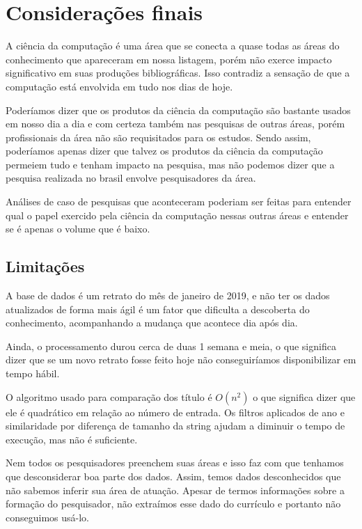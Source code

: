 \chapter{Considerações finais}

A ciência da computação é uma área que se conecta a quase todas as áreas do conhecimento que apareceram em nossa listagem, porém não exerce impacto significativo em suas produções bibliográficas. Isso contradiz a sensação de que a computação está envolvida em tudo nos dias de hoje.

Poderíamos dizer que os produtos da ciência da computação são bastante usados em nosso dia a dia e com certeza também nas pesquisas de outras áreas, porém profissionais da área não são requisitados para os estudos. Sendo assim, poderíamos apenas dizer que talvez os produtos da ciência da computação permeiem tudo e tenham impacto na pesquisa, mas não podemos dizer que a pesquisa realizada no brasil envolve pesquisadores da área.

Análises de caso de pesquisas que aconteceram poderiam ser feitas para entender qual o papel exercido pela ciência da computação nessas outras áreas e entender se é apenas o volume que é baixo.

\section{Limitações}

A base de dados é um retrato do mês de janeiro de 2019, e não ter os dados atualizados de forma mais ágil é um fator que dificulta a descoberta do conhecimento, acompanhando a mudança que acontece dia após dia.

Ainda, o processamento durou cerca de duas 1 semana e meia, o que significa dizer que se um novo retrato fosse feito hoje não conseguiríamos disponibilizar em tempo hábil.

O algoritmo usado para comparação dos título é $O(n^2)$ o que significa dizer que ele é quadrático em relação ao número de entrada. Os filtros aplicados de ano e similaridade por diferença de tamanho da string ajudam a diminuir o tempo de execução, mas não é suficiente.

Nem todos os pesquisadores preenchem suas áreas e isso faz com que tenhamos que desconsiderar boa parte dos dados. Assim, temos dados desconhecidos que não sabemos inferir sua área de atuação. Apesar de termos informações sobre a formação do pesquisador, não extraímos esse dado do currículo e portanto não conseguimos usá-lo.

